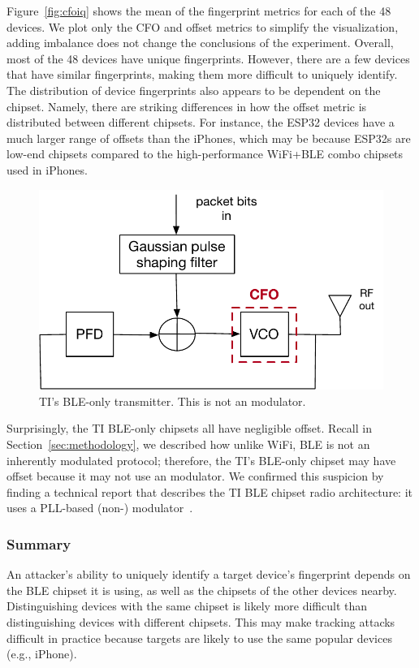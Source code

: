 Figure~\ref{fig:cfoiq} shows the mean of the fingerprint metrics for each of
the 48 devices. We plot only the CFO and \iq offset metrics to simplify the
visualization, adding \iq imbalance does not change the conclusions of the
experiment. Overall, most of the 48 devices have unique fingerprints. However, there
are a few devices that have similar fingerprints, making them more difficult to uniquely identify. The distribution of
device fingerprints also appears to be dependent on the chipset.
Namely, there are striking differences in how the \iq offset metric is
distributed between different chipsets.
For instance, the ESP32 devices have a much
larger range of \iq offsets than the iPhones, which may be
because ESP32s are low-end chipsets compared to the
high-performance WiFi+BLE combo chipsets used in iPhones.

\begin{figure}
    \centering
    \includegraphics[width = 0.8\linewidth]{bletracking/plots/dpll.pdf} 
    \caption{TI's BLE-only transmitter. This is not an \iq modulator.}
    \label{fig:dpll}
\end{figure}

Surprisingly, the TI BLE-only chipsets all have negligible \iq offset.
Recall in Section~\ref{sec:methodology}, we described how unlike WiFi, BLE is
not an inherently \iq modulated protocol; therefore, the TI's BLE-only
chipset may have \iq offset because it may not use an \iq modulator.  We
confirmed this suspicion by finding a technical report that describes the
TI BLE chipset radio architecture: it uses a PLL-based 
(non-\iq) modulator~\cite{pllarchBLE}.

\subsubsection*{Summary} An attacker's ability to uniquely identify a target device's 
fingerprint depends on the BLE chipset it is using, as well as the
chipsets of the other devices nearby. Distinguishing devices
with the same chipset is likely more difficult than distinguishing 
devices with different chipsets. This may make tracking 
attacks difficult in practice because targets are likely to use the same popular devices (e.g.,
iPhone). %

